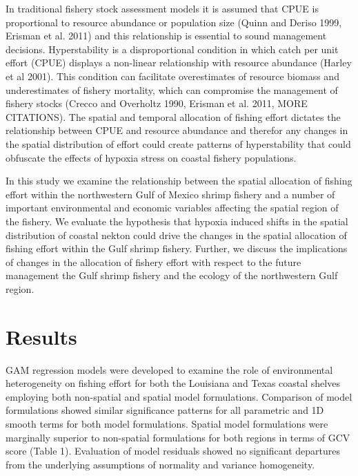 \documentclass[10pt]{article}
\begin{document}
In traditional fishery stock assessment models it is assumed that CPUE is proportional to resource abundance or population size (Quinn and Deriso 1999, Erisman et al. 2011) and this relationship is essential to sound management decisions.  Hyperstability is a disproportional condition in which catch per unit effort (CPUE) displays a non-linear relationship with resource abundance (Harley et al 2001).  This condition can facilitate overestimates of resource biomass and underestimates of fishery mortality, which can compromise the management of fishery stocks (Crecco and Overholtz 1990, Erisman et al. 2011, MORE CITATIONS).  The spatial and temporal allocation of fishing effort dictates the relationship between CPUE and resource abundance and therefor any changes in the spatial distribution of effort could create patterns of hyperstability that could obfuscate the effects of hypoxia stress on coastal fishery populations.  

In this study we examine the relationship between the spatial allocation of fishing effort within the northwestern Gulf of Mexico shrimp fishery and a number of important environmental and economic variables affecting the spatial region of the fishery.  We evaluate the hypothesis that hypoxia induced shifts in the spatial distribution of coastal nekton could drive the changes in the spatial allocation of fishing effort within the Gulf shrimp fishery.  Further, we discuss the implications of changes in the allocation of fishery effort with respect to the future management the Gulf shrimp fishery and the ecology of the northwestern Gulf region.  

\section*{Results}
GAM regression models were developed to examine the role of environmental heterogeneity on fishing effort for both the Louisiana and Texas coastal shelves employing both non-spatial and spatial model formulations.  Comparison of model formulations showed similar significance patterns for all parametric and 1D smooth terms for both model formulations.  Spatial model formulations were marginally superior to non-spatial formulations for both regions in terms of GCV score (Table 1).  Evaluation of model residuals showed no significant departures from the underlying assumptions of normality and variance homogeneity.
\end{document}
